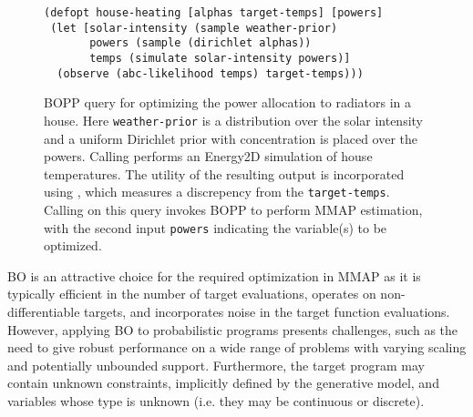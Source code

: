 \begin{figure}[t]
	\begin{lstlisting}[basicstyle=\ttfamily\small]
(defopt house-heating [alphas target-temps] [powers]
 (let [solar-intensity (sample weather-prior)
       powers (sample (dirichlet alphas))
       temps (simulate solar-intensity powers)]
  (observe (abc-likelihood temps) target-temps)))
	\end{lstlisting}	
	\vspace{-6pt}
	\caption{BOPP query for optimizing the power allocation to radiators in a house.  Here \lstinline{weather-prior} is a distribution over the solar intensity and a uniform Dirichlet prior with concentration  is placed over the powers. Calling \simulatec performs an Energy2D simulation of house temperatures. The utility of the resulting output is incorporated using \abcl, which measures a discrepency from the \texttt{target-temps}. Calling \doopt on this query invokes BOPP to perform MMAP estimation, with the second input \lstinline{powers} indicating the variable(s) to be optimized. \label{fig:house-heating-code}}
	\vspace{-10pt}
\end{figure}


BO is an attractive choice for the required optimization in MMAP as it is typically efficient in the number of target evaluations, operates on non-differentiable targets, and incorporates noise in the target function evaluations.  However, applying BO to probabilistic programs presents challenges, such as the need to give robust performance on a wide range of problems with varying scaling and potentially unbounded support.  Furthermore, the target program may contain unknown constraints, implicitly defined by the generative model, and variables whose type is unknown (i.e. they may be continuous or discrete).

